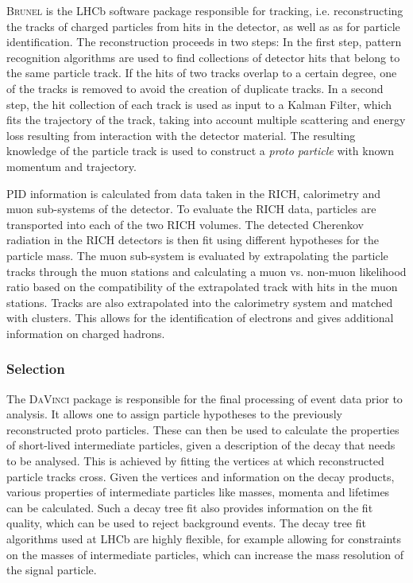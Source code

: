 \textsc{Brunel} is the LHCb software package responsible for tracking, i.e. reconstructing the tracks of charged particles from hits in the detector, as well as as for particle identification.
The reconstruction proceeds in two steps:
In the first step, pattern recognition algorithms are used to find collections of detector hits that belong to the same particle track.
If the hits of two tracks overlap to a certain degree, one of the tracks is removed to avoid the creation of duplicate tracks.
In a second step, the hit collection of each track is used as input to a Kalman Filter, which fits the trajectory of the track, taking into account multiple scattering and energy loss resulting from interaction with the detector material.
The resulting knowledge of the particle track is used to construct a \emph{proto particle} with known momentum and trajectory.

PID information is calculated from data taken in the RICH, calorimetry and muon sub-systems of the detector.
To evaluate the RICH data, particles are transported into each of the two RICH volumes.
The detected Cherenkov radiation in the RICH detectors is then fit using different hypotheses for the particle mass.
The muon sub-system is evaluated by extrapolating the particle tracks through the muon stations and calculating a muon vs. non-muon likelihood ratio based on the compatibility of the extrapolated track with hits in the muon stations.
Tracks are also extrapolated into the calorimetry system and matched with clusters.
This allows for the identification of electrons and gives additional information on charged hadrons.

\subsubsection{Selection}

The \textsc{DaVinci} package is responsible for the final processing of event data prior to analysis.
It allows one to assign particle hypotheses to the previously reconstructed proto particles.
These can then be used to calculate the properties of short-lived intermediate particles, given a description of the decay that needs to be analysed.
This is achieved by fitting the vertices at which reconstructed particle tracks cross.
Given the vertices and information on the decay products, various properties of intermediate particles like masses, momenta and lifetimes can be calculated.
Such a decay tree fit also provides information on the fit quality, which can be used to reject background events.
The decay tree fit algorithms used at LHCb are highly flexible, for example allowing for constraints on the masses of intermediate particles, which can increase the mass resolution of the signal particle.

